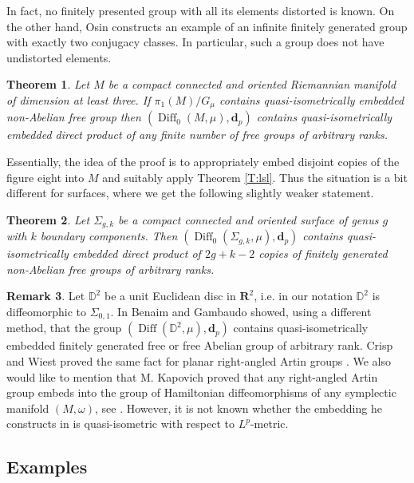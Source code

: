 \documentclass[a4paper,12pt]{amsart}
\def\D{\mathbb{D}}
\def\Diff{\operatorname{Diff}}
\def\o{\omega}
\newtheorem{thm}{Theorem}[section]
\theoremstyle{definition}
\newtheorem{rem}[thm]{Remark}
\def\B{\mathbf}
\begin{document}
In fact, no finitely presented group
with all its elements distorted is known.
On the other hand, Osin \cite{Os} constructs an
example of an infinite finitely generated group with exactly two
conjugacy classes.  In particular, such a group does not have
undistorted elements.

\begin{thm}\label{T:free}
Let $M$ be a compact connected and oriented Riemannian manifold of
dimension at least three. If $\pi_1(M)/G_{\mu}$ contains
quasi-isometrically embedded non-Abelian free group then
$(\Diff_0(M,\mu),\B d_p)$ contains quasi-isometrically
embedded direct product of any finite number of
free groups of arbitrary ranks.
\end{thm}

Essentially, the idea of the proof is to appropriately embed
disjoint copies of the figure eight into $M$ and suitably
apply Theorem \ref{T:lsl}. Thus the situation is a bit
different for surfaces, where we get the following slightly
weaker statement.

\begin{thm}\label{T:free_surface}
Let $\Sigma_{g,k}$ be a compact connected and oriented
surface of genus $g$ with $k$ boundary components.
Then
$(\Diff_0(\Sigma_{g,k},\mu),\B d_p)$ contains quasi-isometrically
embedded direct product of $2g+k-2$ copies of
finitely generated non-Abelian free groups of arbitrary ranks.
\end{thm}

\begin{rem}
Let $\D^2$ be a unit Euclidean disc in $\B R^2$, i.e. in our notation
$\D^2$ is diffeomorphic to $\Sigma_{0,1}$. In \cite{BG} Benaim and
Gambaudo showed, using a different method, that the group
$(\Diff(\D^2,\mu),\B d_p)$ contains quasi-isometrically embedded
finitely generated free or free Abelian group of arbitrary rank. Crisp
and Wiest proved the same fact for planar right-angled Artin groups
\cite{CW}. We also would like to mention that M. Kapovich proved that
any right-angled Artin group embeds into the group of Hamiltonian
diffeomorphisms of any symplectic manifold $(M,\o)$, see
\cite{Ka}. However, it is not known whether the embedding he
constructs in \cite{Ka} is quasi-isometric with respect to
$L^p$-metric.
\end{rem}

\subsection{Examples}\label{SS:examples}
\end{document}
